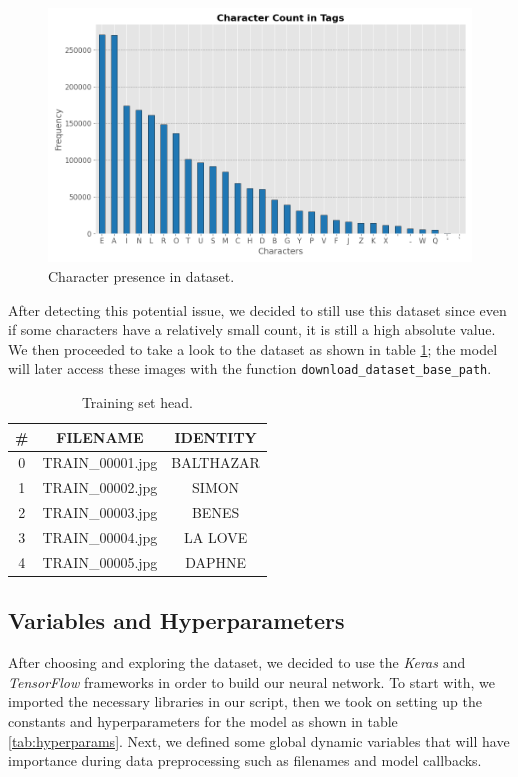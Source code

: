 \documentclass[11pt,letterpaper]{article}
\begin{document}
	\begin{figure}[h]
		\centering
		\includegraphics[width=0.65\linewidth]{character_count.png}
		\caption{Character presence in dataset.}
		\label{fig:char_freq}
	\end{figure}
	
	After detecting this potential issue, we decided to still use this dataset since even if some characters have a relatively small count, it is still a high absolute value. We then proceeded to take a look to the dataset as shown in table \ref{tab:dataset}; the model will later access these images with the function \texttt{download\_dataset\_base\_path}.
	
	\begin{table}[h]
		\centering
		\begin{tabular}{|c|c|c|}
			\hline
			\# & FILENAME & IDENTITY \\
			\hline
			0 & TRAIN\_00001.jpg & BALTHAZAR \\
			\hline
			1 & TRAIN\_00002.jpg & SIMON \\
			\hline
			2 & TRAIN\_00003.jpg & BENES \\
			\hline
			3 & TRAIN\_00004.jpg & LA LOVE \\
			\hline
			4 & TRAIN\_00005.jpg & DAPHNE \\
			\hline
		\end{tabular}
		\caption{Training set head.}
		\label{tab:dataset}
	\end{table}
	
	\newpage
	
	\subsection{Variables and Hyperparameters}
	After choosing and exploring the dataset, we decided to use the \textit{Keras} and \textit{TensorFlow} frameworks in order to build our neural network. To start with, we imported the necessary libraries in our script, then we took on setting up the constants and hyperparameters for the model as shown in table \ref{tab:hyperparams}. Next, we defined some global dynamic variables that will have importance during data preprocessing such as filenames and model callbacks.
	
\end{document}

